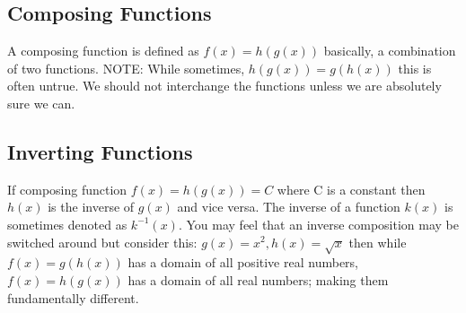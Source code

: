 \subsection{Composing Functions}
A composing function is defined as $f(x)=h(g(x))$ basically, a combination of two functions. NOTE: While sometimes, $h(g(x))=g(h(x))$ this is often untrue. We should not interchange the functions unless we are absolutely sure we can.\\
\subsection{Inverting Functions}
If composing function $f(x)=h(g(x))=C$ where C is a constant then $h(x)$ is the inverse of $g(x)$ and vice versa. The inverse of a function $k(x)$ is sometimes denoted as $k^{-1}(x)$.
You may feel that an inverse composition may be switched around but consider this: $g(x)=x^2, h(x)=\sqrt{x}$ then while $f(x)=g(h(x))$ has a domain of all positive real numbers, $f(x)=h(g(x))$ has a domain of all real numbers; making them fundamentally different.\\
